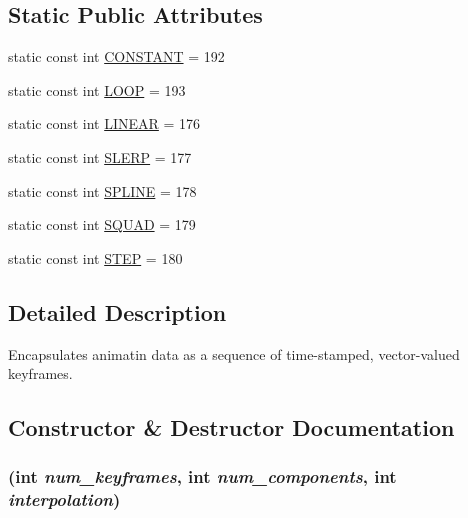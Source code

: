 \subsection*{Static Public Attributes}
\begin{CompactItemize}
\item 
static const int \hyperlink{classm3g_1_1KeyframeSequence_b45ff833865ae8962be27923995f91a3}{CONSTANT} = 192
\item 
static const int \hyperlink{classm3g_1_1KeyframeSequence_ecc439231d4f3639e6f6a9625615a0f7}{LOOP} = 193
\item 
static const int \hyperlink{classm3g_1_1KeyframeSequence_23ccf193c67257f1be26417041cecb31}{LINEAR} = 176
\item 
static const int \hyperlink{classm3g_1_1KeyframeSequence_77ebb943765f530d2883e1c26127d3ce}{SLERP} = 177
\item 
static const int \hyperlink{classm3g_1_1KeyframeSequence_fbb002ac924c1349dead17c16b6fa720}{SPLINE} = 178
\item 
static const int \hyperlink{classm3g_1_1KeyframeSequence_0ad85e76e101b5eabf5a5c5f48648845}{SQUAD} = 179
\item 
static const int \hyperlink{classm3g_1_1KeyframeSequence_07dc1c0bf7f480095150d1b1c34c8218}{STEP} = 180
\end{CompactItemize}


\subsection{Detailed Description}
Encapsulates animatin data as a sequence of time-stamped, vector-valued keyframes. 

\subsection{Constructor \& Destructor Documentation}
\hypertarget{classm3g_1_1KeyframeSequence_f48cc8113ad7300d72840b18529aaf0e}{
\subsubsection[{KeyframeSequence}]{ (int {\em num\_\-keyframes}, \/  int {\em num\_\-components}, \/  int {\em interpolation})}}
\label{classm3g_1_1KeyframeSequence_f48cc8113ad7300d72840b18529aaf0e}


